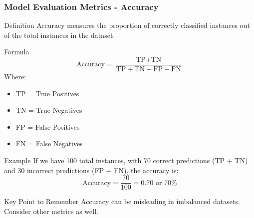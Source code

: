 \documentclass[aspectratio=169]{beamer}
\begin{document}
\begin{frame}[fragile]
    \frametitle{Model Evaluation Metrics - Accuracy}
    \begin{block}{Definition}
        Accuracy measures the proportion of correctly classified instances out of the total instances in the dataset.
    \end{block}
    
    \begin{block}{Formula}
        \begin{equation}
        \text{Accuracy} = \frac{\text{TP} + \text{TN}}{\text{TP} + \text{TN} + \text{FP} + \text{FN}}
        \end{equation}
        Where: \\
        \begin{itemize}
            \item TP = True Positives
            \item TN = True Negatives
            \item FP = False Positives
            \item FN = False Negatives
        \end{itemize}
    \end{block}
    
    \begin{block}{Example}
        If we have 100 total instances, with 70 correct predictions (TP + TN) and 30 incorrect predictions (FP + FN), the accuracy is:
        \begin{equation}
        \text{Accuracy} = \frac{70}{100} = 0.70 \text{ or } 70\%
        \end{equation}
    \end{block}
    
    \begin{block}{Key Point to Remember}
        Accuracy can be misleading in imbalanced datasets. Consider other metrics as well.
    \end{block}
\end{frame}
\end{document}
